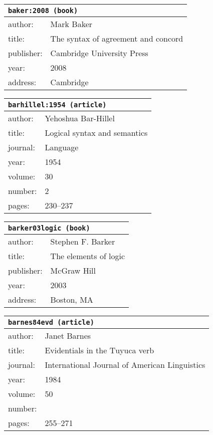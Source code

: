 \documentclass{article}
\begin{document}
\bigskip

\begin{tabular}{p{}p{}}
\multicolumn{2}{l}{\texttt{baker:2008 (book)}}\\
\hline
author: & Mark Baker\\
title: & The syntax of agreement and concord\\
publisher: & Cambridge University Press\\
year: & 2008\\
address: & Cambridge\\
\end{tabular}

\bigskip

\begin{tabular}{p{}p{}}
\multicolumn{2}{l}{\texttt{barhillel:1954 (article)}}\\
\hline
author: & Yehoshua Bar-Hillel\\
title: & Logical syntax and semantics\\
journal: & Language\\
year: & 1954\\
volume: & 30\\
number: & 2\\
pages: & 230--237\\
\end{tabular}

\bigskip

\begin{tabular}{p{}p{}}
\multicolumn{2}{l}{\texttt{barker03logic (book)}}\\
\hline
author: & Stephen F. Barker\\
title: & The elements of logic\\
publisher: & McGraw Hill\\
year: & 2003\\
address: & Boston, MA\\
\end{tabular}

\bigskip

\begin{tabular}{p{}p{}}
\multicolumn{2}{l}{\texttt{barnes84evd (article)}}\\
\hline
author: & Janet Barnes\\
title: & Evidentials in the \textsc{T}uyuca verb\\
journal: & International Journal of American Linguistics\\
year: & 1984\\
volume: & 50\\
number: & \\
pages: & 255--271\\
\end{tabular}
\end{document}
